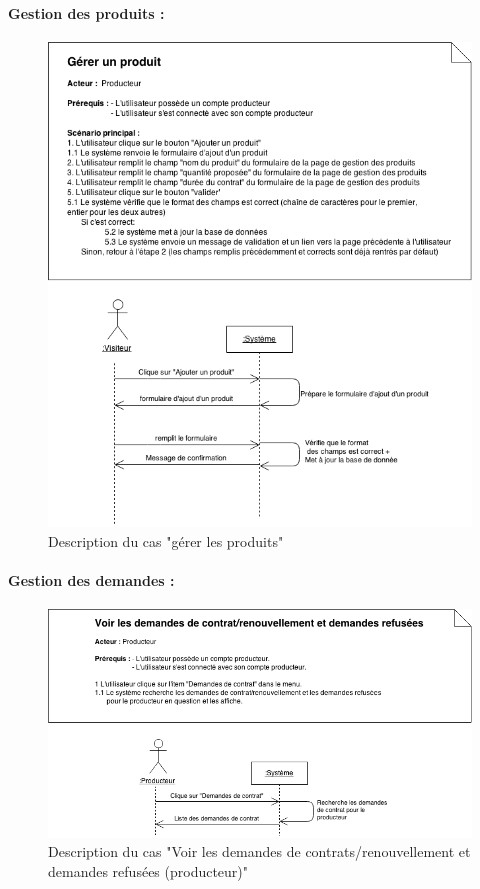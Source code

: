 \documentclass[12pt]{report}
\begin{document}
\paragraph*{Gestion des produits :}
\begin{figure}[!Hb]
\centering
\includegraphics[width=1.\textwidth]{./ressources/desc_UC_gerer_produit.png}
\caption{Description du cas "gérer les produits"}
\end{figure}
\clearpage

\paragraph*{Gestion des demandes :}
\begin{figure}[!Hb]
\centering
\includegraphics[width=1.1\textwidth]{./ressources/desc_UC_voir_demandes_prod.png}
\caption{Description du cas "Voir les demandes de contrats/renouvellement et demandes refusées (producteur)"}\vspace{80 mm}
\end{figure}
\clearpage
\end{document}
